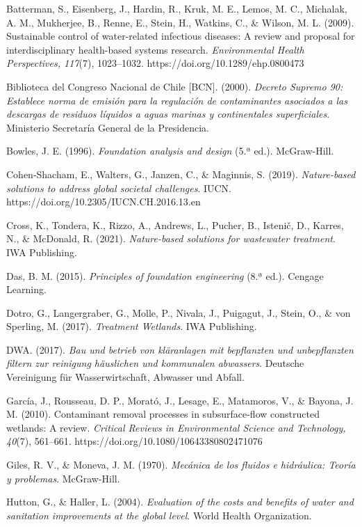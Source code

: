 \documentclass[12pt, letterpaper]{report}
\begin{document}
Batterman, S., Eisenberg, J., Hardin, R., Kruk, M. E., Lemos, M. C., Michalak, A. M., Mukherjee, B., Renne, E., Stein, H., Watkins, C., \& Wilson, M. L. (2009). Sustainable control of water-related infectious diseases: A review and proposal for interdisciplinary health-based systems research. \textit{Environmental Health Perspectives, 117}(7), 1023--1032. https://doi.org/10.1289/ehp.0800473

Biblioteca del Congreso Nacional de Chile [BCN]. (2000). \textit{Decreto Supremo 90: Establece norma de emisión para la regulación de contaminantes asociados a las descargas de residuos líquidos a aguas marinas y continentales superficiales}. Ministerio Secretaría General de la Presidencia.

Bowles, J. E. (1996). \textit{Foundation analysis and design} (5.ª ed.). McGraw-Hill.

Cohen-Shacham, E., Walters, G., Janzen, C., \& Maginnis, S. (2019). \textit{Nature-based solutions to address global societal challenges}. IUCN. https://doi.org/10.2305/IUCN.CH.2016.13.en

Cross, K., Tondera, K., Rizzo, A., Andrews, L., Pucher, B., Istenič, D., Karres, N., \& McDonald, R. (2021). \textit{Nature-based solutions for wastewater treatment}. IWA Publishing.

Das, B. M. (2015). \textit{Principles of foundation engineering} (8.ª ed.). Cengage Learning.

Dotro, G., Langergraber, G., Molle, P., Nivala, J., Puigagut, J., Stein, O., \& von Sperling, M. (2017). \textit{Treatment Wetlands}. IWA Publishing.

DWA. (2017). \textit{Bau und betrieb von kläranlagen mit bepflanzten und unbepflanzten filtern zur reinigung häuslichen und kommunalen abwassers}. Deutsche Vereinigung für Wasserwirtschaft, Abwasser und Abfall.

García, J., Rousseau, D. P., Morató, J., Lesage, E., Matamoros, V., \& Bayona, J. M. (2010). Contaminant removal processes in subsurface-flow constructed wetlands: A review. \textit{Critical Reviews in Environmental Science and Technology, 40}(7), 561--661. https://doi.org/10.1080/10643380802471076

Giles, R. V., \& Moneva, J. M. (1970). \textit{Mecánica de los fluidos e hidráulica: Teoría y problemas}. McGraw-Hill.

Hutton, G., \& Haller, L. (2004). \textit{Evaluation of the costs and benefits of water and sanitation improvements at the global level}. World Health Organization.
\end{document}
